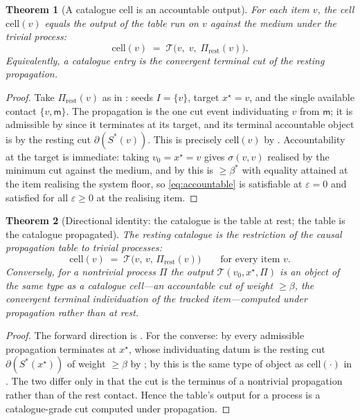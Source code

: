 \documentclass[11pt,twocolumn,a4paper]{article}
\theoremstyle{dirthm}
\newtheorem{theorem}{Theorem}[section]
\theoremstyle{definition}
\theoremstyle{remark}
\newcommand{\med}{\mathsf{m}}
\newcommand{\flo}{\beta}
\newcommand{\cut}{\partial}
\newcommand{\str}{\sigma}
\newcommand{\Proc}{\Pi}
\newcommand{\Tab}{\mathcal{T}}
\newcommand{\cell}{\mathrm{cell}}
\newcommand{\set}[1]{\{#1\}}
\newcommand{\eps}{\varepsilon}
\begin{document}
\begin{theorem}[A catalogue cell is an accountable output]
\label{thm:cell-is-output}
For each item $v$, the cell $\cell(v)$ equals the output of the table run on
$v$ against the medium under the trivial process:
\[
\cell(v)\;=\;\Tab\bigl(v,\;v,\;\Proc_{\mathrm{rest}}(v)\bigr).
\]
Equivalently, a catalogue entry is the convergent terminal cut of the resting
propagation.
\end{theorem}

\begin{proof}
Take $\Proc_{\mathrm{rest}}(v)$ as in : seeds
$I=\set{v}$, target $x^{\star}=v$, and the single available contact
$\set{v,\med}$. The propagation is the one cut event individuating $v$ from
$\med$; it is admissible by  since it terminates at
its target, and its terminal accountable object is by  the
resting cut $\cut(S^{\ast}(v))$. This is precisely $\cell(v)$ by
. Accountability at the target is immediate: taking
$v_0=x^{\star}=v$ gives $\str(v,v)$ realised by the minimum cut against the
medium, and by  this is $\ge\flo^{\ast}$ with equality
attained at the item realising the system floor, so
\eqref{eq:accountable} is satisfiable at $\eps=0$ and satisfied for all
$\eps\ge0$ at the realising item.
\end{proof}

\begin{theorem}[Directional identity: the catalogue is the table at rest;
the table is the catalogue propagated]
\label{thm:catalogue-table}
The resting catalogue is the restriction of the causal propagation table to
trivial processes:
\[
\cell(v)\;=\;\Tab\bigl(v,\,v,\,\Proc_{\mathrm{rest}}(v)\bigr)
\qquad\text{for every item }v .
\]
Conversely, for a nontrivial process $\Proc$ the output
$\Tab(v_0,x^{\star},\Proc)$ is an object of the \emph{same type} as a
catalogue cell---an accountable cut of weight $\ge\flo$, the convergent
terminal individuation of the tracked item---computed under propagation
rather than at rest.
\end{theorem}

\begin{proof}
The forward direction is . For the converse: by
 every admissible propagation terminates at
$x^{\star}$, whose individuating datum is the resting cut
$\cut(S^{\ast}(x^{\star}))$ of weight $\ge\flo$ by ; by
 this is the same type of object as $\cell(\cdot)$ in
. The two differ only in that the cut is the terminus of a
nontrivial propagation rather than of the rest contact. Hence the table's
output for a process is a catalogue-grade cut computed under propagation.
\end{proof}
\end{document}
